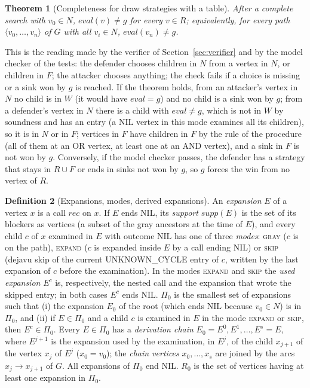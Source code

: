 \documentclass{article}
\theoremstyle{plain}
\newtheorem{theorem}{Theorem}[section]
\theoremstyle{definition}
\newtheorem{definition}[theorem]{Definition}
\theoremstyle{remark}
\newcommand{\eval}{\mathit{eval}}
\newcommand{\NIL}{\ensuremath{\mathrm{NIL}}}
\newcommand{\UC}{\textsf{UNKNOWN\_CYCLE}}
\begin{document}
\begin{theorem}[Completeness for draw strategies with a table]\label{thm:48table}
After a complete search with $v_0 \in N$, $\eval(v) \neq g$ for every $v \in R$; equivalently, for every path $\langle v_0, \dots, v_n\rangle$ of $G$ with all $v_i \in N$, $\eval(v_n) \neq g$.
\end{theorem}

This is the reading made by the verifier of Section~\ref{sec:verifier} and by the model checker of the tests: the defender chooses children in $N$ from a vertex in $N$, or children in $F$; the attacker chooses anything; the check fails if a choice is missing or a sink won by $g$ is reached. If the theorem holds, from an attacker's vertex in $N$ no child is in $W$ (it would have $\eval = g$) and no child is a sink won by $g$; from a defender's vertex in $N$ there is a child with $\eval \neq g$, which is not in $W$ by soundness and has an entry (a \NIL{} vertex in this mode examines all its children), so it is in $N$ or in $F$; vertices in $F$ have children in $F$ by the rule of the procedure (all of them at an OR vertex, at least one at an AND vertex), and a sink in $F$ is not won by $g$. Conversely, if the model checker passes, the defender has a strategy that stays in $R \cup F$ or ends in sinks not won by $g$, so $g$ forces the win from no vertex of $R$.

\begin{definition}[Expansions, modes, derived expansions]
An \emph{expansion} $E$ of a vertex $x$ is a call $\mathit{rec}$ on $x$. If $E$ ends \NIL{}, its \emph{support} $\mathit{supp}(E)$ is the set of its blockers as vertices (a subset of the gray ancestors at the time of $E$), and every child $c$ of $x$ examined in $E$ with outcome \NIL{} has one of three \emph{modes}: \textsc{gray} ($c$ is on the path), \textsc{expand} ($c$ is expanded inside $E$ by a call ending \NIL{}) or \textsc{skip} (dejavu skip of the current \UC{} entry of $c$, written by the last expansion of $c$ before the examination). In the modes \textsc{expand} and \textsc{skip} the \emph{used expansion} $E^c$ is, respectively, the nested call and the expansion that wrote the skipped entry; in both cases $E^c$ ends \NIL{}. $\Pi_0$ is the smallest set of expansions such that (i) the expansion $E_0$ of the root (which ends \NIL{} because $v_0 \in N$) is in $\Pi_0$, and (ii) if $E \in \Pi_0$ and a child $c$ is examined in $E$ in the mode \textsc{expand} or \textsc{skip}, then $E^c \in \Pi_0$. Every $E \in \Pi_0$ has a \emph{derivation chain} $E_0 = E^0, E^1, \dots, E^s = E$, where $E^{j+1}$ is the expansion used by the examination, in $E^j$, of the child $x_{j+1}$ of the vertex $x_j$ of $E^j$ ($x_0 = v_0$); the \emph{chain vertices} $x_0, \dots, x_s$ are joined by the arcs $x_j \to x_{j+1}$ of $G$. All expansions of $\Pi_0$ end \NIL{}. $R_0$ is the set of vertices having at least one expansion in $\Pi_0$.
\end{definition}
\end{document}
